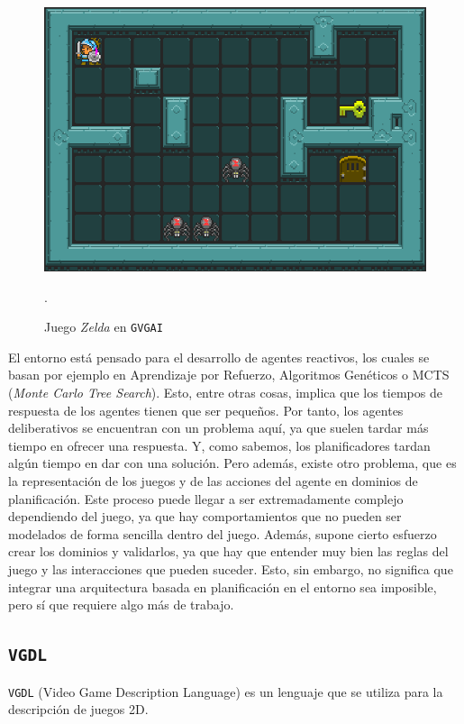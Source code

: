 \begin{figure}[H]
    \centering
    \includegraphics[scale=0.4]{img/CH02/zelda.png}
    \caption{Juego \textit{Zelda} en \texttt{GVGAI}}.
    \label{fig:zelda}
\end{figure}

El entorno está pensado para el desarrollo de agentes reactivos, los cuales se basan por ejemplo en
Aprendizaje por Refuerzo, Algoritmos Genéticos o MCTS (\textit{Monte Carlo Tree Search}). Esto, entre
otras cosas, implica que los tiempos de respuesta de los agentes tienen que ser pequeños. Por tanto,
los agentes deliberativos se encuentran con un problema aquí, ya que suelen tardar más tiempo en ofrecer
una respuesta. Y, como sabemos, los planificadores tardan algún tiempo en dar con una solución. Pero además,
existe otro problema, que es la representación de los juegos y de las acciones del agente en
dominios de planificación. Este proceso puede llegar a ser extremadamente complejo dependiendo
del juego, ya que hay comportamientos que no pueden ser modelados de forma sencilla dentro del juego.
Además, supone cierto esfuerzo crear los dominios y validarlos, ya que hay que entender muy bien las reglas
del juego y las interacciones que pueden suceder. Esto, sin embargo, no significa que integrar una arquitectura
basada en planificación en el entorno sea imposible, pero sí que requiere algo más de trabajo.

\subsection{\texttt{VGDL}}

\texttt{VGDL} (Video Game Description Language) \cite{Schaul2013AVG} es un lenguaje que se
utiliza para la descripción de juegos 2D.

